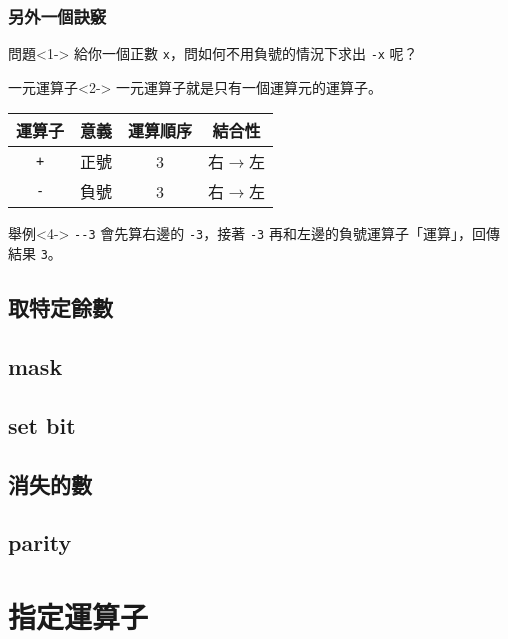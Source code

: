 \documentclass[utf8]{beamer}
\begin{document}
\begin{CJK}{UTF8}{bkai}
\begin{frame}[fragile]
  \frametitle{另外一個訣竅}
  \begin{alertblock}{問題}<1->
  給你一個正數 \lstinline{x}{}，問如何不用負號的情況下求出 \lstinline{-x}{} 呢？
  \end{alertblock}
  \begin{block}{一元運算子}<2->
    \alert{一元運算子}就是只有一個運算元的運算子。
    \pause \pause
    \begin{table}[h]
      \begin{tabular}{|c|c|c|c|}
      \hline
      運算子           & 意義 & 運算順序 & 結合性\\
      \hline
      \lstinline{+}{} & 正號 & 3      & \alert{右$\rightarrow$左}\\
      \hline
      \lstinline{-}{} & 負號 & 3      & \alert{右$\rightarrow$左}\\
      \hline
      \end{tabular}
    \end{table}
  \end{block}
  \begin{exampleblock}{舉例}<4->
  \lstinline{--3}{} 會先算右邊的 \lstinline{-3}{}，接著 \lstinline{-3}{} 再和左邊的負號運算子「運算」，回傳結果 \lstinline{3}{}。
  \end{exampleblock}
\end{frame}

\subsection{取特定餘數}

\subsection{mask}

\subsection{set bit}

\subsection{消失的數}

\subsection{parity}

\section{指定運算子}


\end{CJK}
\end{document}
